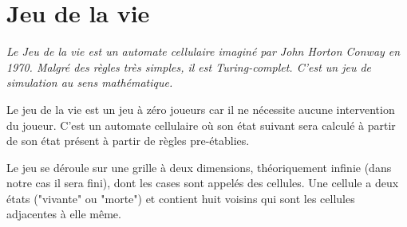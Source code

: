 %
%
% 
% 
% 
\newpage
\chapter{Jeu de la vie}

\textit{Le Jeu de la vie est un automate cellulaire imaginé par John Horton Conway en 1970. Malgré des règles très simples, il est Turing-complet. C'est un jeu de simulation au sens mathématique.}

\medskip

Le jeu de la vie est un jeu à zéro joueurs car il ne nécessite aucune intervention du joueur. C'est un automate cellulaire où son état suivant sera calculé à partir de son état présent à partir de règles pre-établies.

\medskip

Le jeu se déroule sur une grille à deux dimensions, théoriquement infinie (dans notre cas il sera fini), dont les cases sont appelés des cellules. Une cellule a deux états ("vivante" ou "morte") et contient huit voisins qui sont les cellules adjacentes à elle même.

